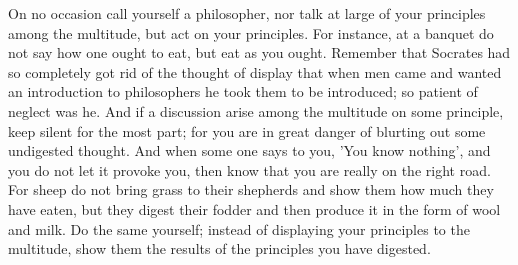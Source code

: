 On  no  occasion  call yourself  a  philosopher,  nor  talk  at large  of  your
principles among the multitude, but act  on your principles. For instance, at a
banquet do not  say how one ought to  eat, but eat as you  ought. Remember that
Socrates had so completely got rid of the thought of display that when men came
and wanted  an introduction to philosophers  he took them to  be introduced; so
patient of  neglect was he.  And if a discussion  arise among the  multitude on
some principle, keep silent  for the most part; for you are  in great danger of
blurting out some undigested thought. And when  some one says to you, 'You know
nothing', and you do  not let it provoke you, then know that  you are really on
the right road. For  sheep do not bring grass to their  shepherds and show them
how much they have  eaten, but they digest their fodder and  then produce it in
the form  of wool and  milk. Do the same  yourself; instead of  displaying your
principles to the  multitude, show them the results of  the principles you have
digested.

